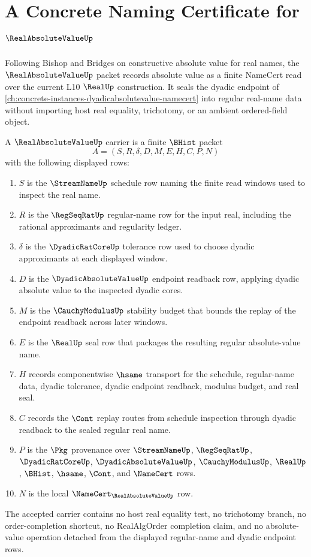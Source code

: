 \chapter{A Concrete Naming Certificate for $\RealAbsoluteValueUp$}
\label{ch:concrete-instances-real-absolute-value-namecert}

Following Bishop and Bridges on constructive absolute value for real names, the $\RealAbsoluteValueUp$ packet records absolute value as a finite NameCert read over the current L10 $\RealUp$ construction. It seals the dyadic endpoint of \autoref{ch:concrete-instances-dyadicabsolutevalue-namecert} into regular real-name data without importing host real equality, trichotomy, or an ambient ordered-field object.

\begin{definition}
\label{def:real-absolute-value-carrier}
A $\RealAbsoluteValueUp$ carrier is a finite $\BHist$ packet
$$
A=(S,R,\delta,D,M,E,H,C,P,N)
$$
with the following displayed rows:
\begin{enumerate}
\item $S$ is the $\StreamNameUp$ schedule row naming the finite read windows used to inspect the real name.
\item $R$ is the $\RegSeqRatUp$ regular-name row for the input real, including the rational approximants and regularity ledger.
\item $\delta$ is the $\DyadicRatCoreUp$ tolerance row used to choose dyadic approximants at each displayed window.
\item $D$ is the $\DyadicAbsoluteValueUp$ endpoint readback row, applying dyadic absolute value to the inspected dyadic cores.
\item $M$ is the $\CauchyModulusUp$ stability budget that bounds the replay of the endpoint readback across later windows.
\item $E$ is the $\RealUp$ seal row that packages the resulting regular absolute-value name.
\item $H$ records componentwise $\hsame$ transport for the schedule, regular-name data, dyadic tolerance, dyadic endpoint readback, modulus budget, and real seal.
\item $C$ records the $\Cont$ replay routes from schedule inspection through dyadic readback to the sealed regular real name.
\item $P$ is the $\Pkg$ provenance over $\StreamNameUp$, $\RegSeqRatUp$, $\DyadicRatCoreUp$, $\DyadicAbsoluteValueUp$, $\CauchyModulusUp$, $\RealUp$, $\BHist$, $\hsame$, $\Cont$, and $\NameCert$ rows.
\item $N$ is the local $\NameCert_{\RealAbsoluteValueUp}$ row.
\end{enumerate}
The accepted carrier contains no host real equality test, no trichotomy branch, no order-completion shortcut, no RealAlgOrder completion claim, and no absolute-value operation detached from the displayed regular-name and dyadic endpoint rows.
\end{definition}

